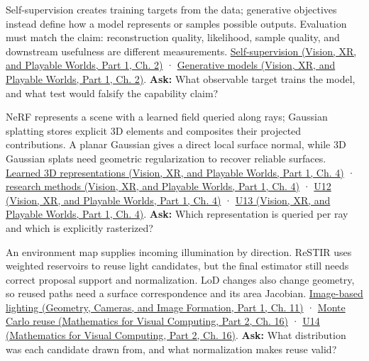 Self-supervision creates training targets from the data; generative objectives instead define how a model represents or samples possible outputs. Evaluation must match the claim: reconstruction quality, likelihood, sample quality, and downstream usefulness are different measurements. \href{../07-Vision-XR-and-Playable-Worlds-P01/main.pdf\#nameddest=04-visual-computing-ii-ch031-self-supervision-and-evaluation}{Self-supervision (Vision, XR, and Playable Worlds, Part 1, Ch. 2)} · \href{../07-Vision-XR-and-Playable-Worlds-P01/main.pdf\#nameddest=04-visual-computing-ii-ch031-generative-models-learn-distributions-and-samplers}{Generative models (Vision, XR, and Playable Worlds, Part 1, Ch. 2)}. \textbf{Ask:} What observable target trains the model, and what test would falsify the capability claim?

NeRF represents a scene with a learned field queried along rays; Gaussian splatting stores explicit 3D elements and composites their projected contributions. A planar Gaussian gives a direct local surface normal, while 3D Gaussian splats need geometric regularization to recover reliable surfaces. \href{../07-Vision-XR-and-Playable-Worlds-P01/main.pdf\#nameddest=04-visual-computing-ii-ch034-learned-representations-of-3d-shape-and-scenes}{Learned 3D representations (Vision, XR, and Playable Worlds, Part 1, Ch. 4)} · \href{../07-Vision-XR-and-Playable-Worlds-P01/main.pdf\#nameddest=04-visual-computing-ii-ch034-from-scene-representations-to-research-methods}{research methods (Vision, XR, and Playable Worlds, Part 1, Ch. 4)} · \href{../07-Vision-XR-and-Playable-Worlds-P01/main.pdf\#nameddest=04-visual-computing-ii-ch034-figure-u12---volume-compositing-accumulates-visible-contributions}{U12 (Vision, XR, and Playable Worlds, Part 1, Ch. 4)} · \href{../07-Vision-XR-and-Playable-Worlds-P01/main.pdf\#nameddest=04-visual-computing-ii-ch034-figure-u13---a-local-gaussian-covariance-projects-to-an-ellipse}{U13 (Vision, XR, and Playable Worlds, Part 1, Ch. 4)}. \textbf{Ask:} Which representation is queried per ray and which is explicitly rasterized?

An environment map supplies incoming illumination by direction. ReSTIR uses weighted reservoirs to reuse light candidates, but the final estimator still needs correct proposal support and normalization. LoD changes also change geometry, so reused paths need a surface correspondence and its area Jacobian. \href{../03-Geometry-Cameras-and-Image-Formation-P01/main.pdf\#nameddest=03-visual-computing-i-ch004-light-measurement-and-radiometry}{Image-based lighting (Geometry, Cameras, and Image Formation, Part 1, Ch. 11)} · \href{../02-Mathematics-for-Visual-Computing-P02/main.pdf\#nameddest=03-visual-computing-i-ch012-numerical-integration-and-monte-carlo-estimation}{Monte Carlo reuse (Mathematics for Visual Computing, Part 2, Ch. 16)} · \href{../02-Mathematics-for-Visual-Computing-P02/main.pdf\#nameddest=03-visual-computing-i-ch012-figure-u14---a-reservoir-selects-a-candidate-by-its-weight}{U14 (Mathematics for Visual Computing, Part 2, Ch. 16)}. \textbf{Ask:} What distribution was each candidate drawn from, and what normalization makes reuse valid?

